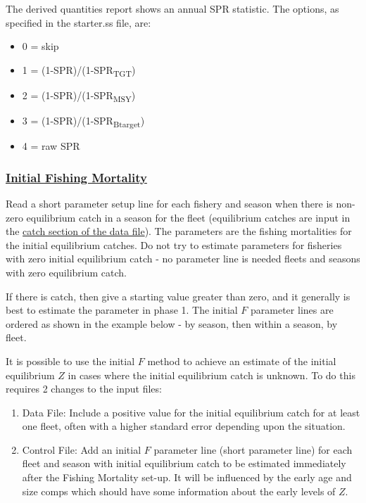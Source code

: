 The derived quantities report shows an annual SPR statistic. The options, as specified in the starter.ss file, are:
\begin{itemize}
	\item 0 = skip
	\item 1 = (1-SPR)/(1-SPR\textsubscript{TGT})
	\item 2 = (1-SPR)/(1-SPR\textsubscript{MSY})
	\item 3 = (1-SPR)/(1-SPR\textsubscript{Btarget})
	\item 4 = raw SPR
\end{itemize}

\hypertarget{InitF}{}
\subsubsection[Initial Fishing Mortality]{\protect\hyperlink{InitF}{Initial Fishing Mortality}}
Read a short parameter setup line for each fishery and season when there is non-zero equilibrium catch in a season for the fleet (equilibrium catches are input in the \hyperlink{CatchFormat}{catch section of the data file}). The parameters are the fishing mortalities for the initial equilibrium catches. Do not try to estimate parameters for fisheries with zero initial equilibrium catch - no parameter line is needed fleets and seasons with zero equilibrium catch.

If there is catch, then give a starting value greater than zero, and it generally is best to estimate the parameter in phase 1. The initial $F$ parameter lines are ordered as shown in the example below - by season, then within a season, by fleet.

It is possible to use the initial $F$ method to achieve an estimate of the initial equilibrium $Z$ in cases where the initial equilibrium catch is unknown. To do this requires 2 changes to the input files:
\begin{enumerate}
	\item Data File: Include a positive value for the initial equilibrium catch for at least one fleet, often with a higher standard error depending upon the situation.
	\item Control File: Add an initial $F$ parameter line (short parameter line) for each fleet and season with initial equilibrium catch to be estimated immediately after the Fishing Mortality set-up. It will be influenced by the early age and size comps which should have some information about the early levels of $Z$.
\end{enumerate}


